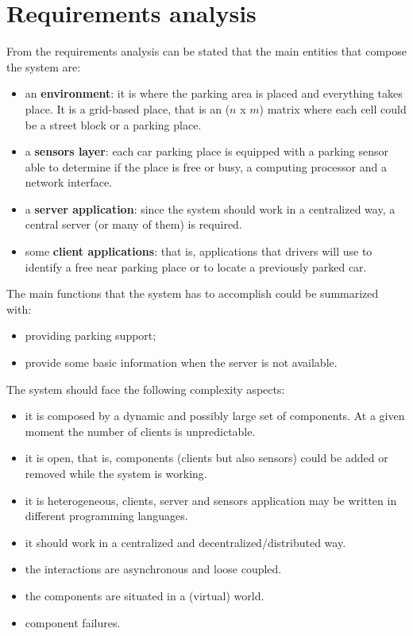 \documentclass[11pt]{article}
\begin{document}
\section{Requirements analysis}
From the requirements analysis can be stated that the main entities that compose the system are:
\begin{itemize}
\item an \textbf{environment}: it is where the parking area is placed and everything takes place. It is a grid-based place, that is an ($n$ x $m$) matrix where each cell could be a street block or a parking place.
\item a \textbf{sensors layer}: each car parking place is equipped with a parking sensor able to determine if the place is free or busy, a computing processor and a network interface.
\item a \textbf{server application}: since the system should work in a centralized way, a central server (or many of them) is required.
\item some \textbf{client applications}: that is, applications that drivers will use to identify a free near parking place or to locate a previously parked car.
\end{itemize}
The main functions that the system has to accomplish could be summarized with:
\begin{itemize}
\item providing parking support;
\item provide some basic information when the server is not available.
\end{itemize}

The system should face the following complexity aspects:
\begin{itemize}
\item it is composed by a dynamic and possibly large set of components. At a given moment the number of clients is unpredictable.
\item it is open, that is, components (clients but also sensors) could be added or removed while the system is working.
\item it is heterogeneous, clients, server and sensors application may be written in different programming languages.
\item it should work in a centralized and decentralized/distributed way.
\item the interactions are asynchronous and loose coupled.
\item the components are situated in a (virtual) world.
\item component failures.
\end{itemize}
\end{document}
